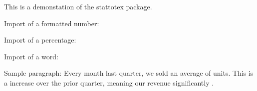 \documentclass{article}
\begin{document}
    This is a demonstation of the stattotex package.

    Import of a formatted number: \AvgMonthlySales

    Import of a percentage: \SaleIncPct

    Import of a word: \SaleDir

    Sample paragraph: Every month last quarter, we sold an average of \AvgMonthlySales \space units. This is a \SaleIncPct \space increase over the prior quarter, meaning our revenue significantly \SaleDir.
\end{document}
